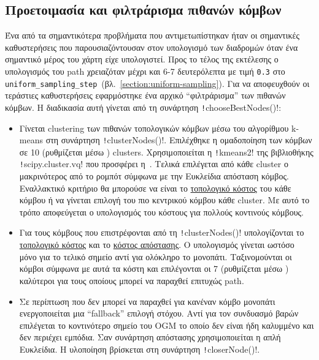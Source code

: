 \subsection{Προετοιμασία και φιλτράρισμα πιθανών κόμβων}
Ένα από τα σημαντικότερα προβλήματα που αντιμετωπίστηκαν ήταν οι σημαντικές καθυστερήσεις που παρουσιαζόντουσαν στον υπολογισμό των διαδρομών όταν ένα σημαντικό μέρος του χάρτη είχε υπολογιστεί.
Προς το τέλος της εκτέλεσης ο υπολογισμός του path χρειαζόταν μέχρι και 6-7 δευτερόλεπτα με τιμή
\texttt{0.3} στο \texttt{uniform\_sampling\_step}~(βλ.~\ref{section:uniform-sampling}).
Για να αποφευχθούν οι τεράστιες καθυστερήσεις εφαρμόστηκε ένα αρχικό ``φιλτράρισμα'' των πιθανών κόμβων.
Η διαδικασία αυτή γίνεται από τη συνάρτηση \texttt!chooseBestNodes()!:
\begin{itemize}
    \item Γίνεται clustering των πιθανών τοπολογικών κόμβων μέσω του αλγορίθμου k-means στη συνάρτηση \texttt!clusterNodes()!.
          Επιλέχθηκε η ομαδοποίηση των κόμβων σε
          10 (ρυθμίζεται μέσω ) clusters.
          Χρησιμοποιείται η \texttt!kmeans2! της βιβλιοθήκης \texttt!scipy.cluster.vq!
          που προσφέρει η~\cite{scipy}.
          Τελικά επιλέγεται από κάθε cluster ο μακρινότερος από το ρομπότ σύμφωνα με την Ευκλείδια απόσταση κόμβος.
          Εναλλακτικό κριτήριο θα μπορούσε να είναι το \hyperref[section:topo-cost]{τοπολογικό κόστος} του κάθε κόμβου ή να γίνεται επιλογή του πιο κεντρικού κόμβου κάθε cluster.
          Με αυτό το τρόπο αποφεύγεται ο υπολογισμός του κόστους για πολλούς κοντινούς κόμβους.

    \item Για τους κόμβους που επιστρέφονται από τη \texttt!clusterNodes()! υπολογίζονται το
          \hyperref[section:topo-cost]{τοπολογικό κόστος} και το \hyperref[section:distance-cost]{κόστος απόστασης}.
          Ο υπολογισμός γίνεται ωστόσο μόνο για το τελικό σημείο αντί για ολόκληρο το μονοπάτι.
          Ταξινομούνται οι κόμβοι σύμφωνα με αυτά τα κόστη και επιλέγονται οι
          7 (ρυθμίζεται μέσω ) καλύτεροι για τους οποίους μπορεί να παραχθεί επιτυχώς path.

    \item Σε περίπτωση που δεν μπορεί να παραχθεί για κανέναν κόμβο μονοπάτι ενεργοποιείται μια ``fallback'' επιλογή στόχου.
          Αντί για τον συνδυασμό βαρών επιλέγεται το κοντινότερο σημείο του OGM το οποίο δεν είναι ήδη καλυμμένο και δεν περιέχει εμπόδια.
          Σαν συνάρτηση απόστασης χρησιμοποιείται η απλή Ευκλείδια.
          Η υλοποίηση βρίσκεται στη συνάρτηση \texttt!closerNode()!.


\end{itemize}

